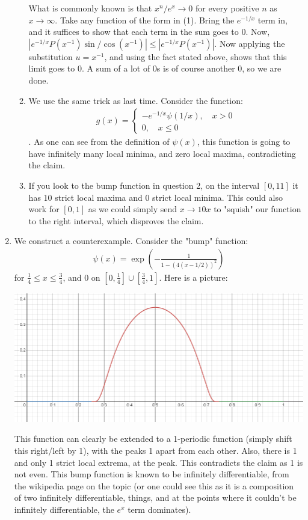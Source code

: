 \documentclass[12pt]{article}
\theoremstyle{definition}
\theoremstyle{remark}
\begin{document}
\begin{enumerate}[leftmargin=\labelsep]
\begin{enumerate}
			What is commonly known is that $x^n/e^x \to 0$ for every positive $n$ as $x \to \infty$. Take any function of the form in (1). Bring the $e^{-1/x}$ term in, and it suffices to show that each term in the sum goes to 0. Now, $|e^{-1/x}P(x^{-1})\sin/\cos(x^{-1})| \leq |e^{-1/x}P(x^{-1})|$. Now applying the substitution $u = x^{-1}$, and using the fact stated above, shows that this limit goes to 0. A sum of a lot of 0s is of course another 0, so we are done.
			\item We use the same trick as last time. Consider the function: \begin{align*}
				g(x) = \begin{cases}
					-e^{-1/x}\psi(1/x), \quad x > 0 \\
					0, \quad x \leq 0
				\end{cases}
			\end{align*}. As one can see from the definition of $\psi(x)$, this function is going to have infinitely many local minima, and zero local maxima, contradicting the claim.
			\item If you look to the bump function in question 2, on the interval $[0, 11]$ it has 10 strict local maxima and 0 strict local minima. This could also work for $[0, 1]$ as we could simply send $x \to 10x$ to "squish" our function to the right interval, which disproves the claim.
		\end{enumerate}
	
	\item 
	We construct a counterexample. Consider the "bump" function:
	\begin{align*}
		\psi(x) = \exp(-\frac1{1-(4(x-1/2))^2})
	\end{align*} for $\frac14 \leq x \leq \frac34$, and $0$ on $[0, \frac14] \cup [\frac34, 1]$. Here is a picture:
	
	\includegraphics[scale=0.5]{function.png}
	
	This function can clearly be extended to a 1-periodic function (simply shift this right/left by 1), with the peaks 1 apart from each other. Also, there is 1 and only 1 strict local extrema, at the peak. This contradicts the claim as 1 is not even. This bump function is known to be infinitely differentiable, from the wikipedia page on the topic (or one could see this as it is a composition of two infinitely differentiable, things, and at the points where it couldn't be infinitely differentiable, the $e^x$ term dominates).
	

\end{enumerate}
\end{document}
